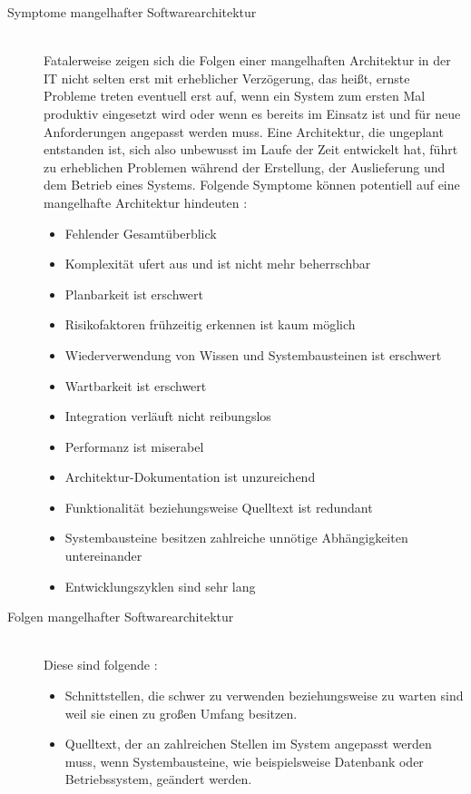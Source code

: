 \begin{description}
\item[Symptome mangelhafter Softwarearchitektur] \hfill \\
Fatalerweise zeigen sich die Folgen einer mangelhaften Architektur in der IT nicht selten erst mit erheblicher Verzögerung, das heißt, ernste Probleme treten eventuell erst auf, wenn ein System zum ersten Mal produktiv eingesetzt wird oder wenn es bereits im Einsatz ist und für neue Anforderungen angepasst werden muss. Eine Architektur, die ungeplant entstanden ist, sich also unbewusst im Laufe der Zeit entwickelt hat, führt zu erheblichen Problemen während der Erstellung, der Auslieferung und dem Betrieb eines Systems. Folgende Symptome können potentiell auf eine mangelhafte Architektur hindeuten \citereset \autocite{Vogel.2009}:
\begin{itemize}
\item Fehlender Gesamtüberblick
\item Komplexität ufert aus und ist nicht mehr beherrschbar
\item Planbarkeit ist erschwert
\item Risikofaktoren frühzeitig erkennen ist kaum möglich
\item Wiederverwendung von Wissen und Systembausteinen ist erschwert
\item Wartbarkeit ist erschwert
\item Integration verläuft nicht reibungslos
\item Performanz ist miserabel
\item Architektur-Dokumentation ist unzureichend
\item Funktionalität beziehungsweise Quelltext ist redundant
\item Systembausteine besitzen zahlreiche unnötige Abhängigkeiten untereinander
\item Entwicklungszyklen sind sehr lang
\end{itemize}
\item[Folgen mangelhafter Softwarearchitektur] \hfill \\
Diese sind folgende \citereset \autocite{Vogel.2009}:
\begin{itemize}
\item Schnittstellen, die schwer zu verwenden beziehungsweise zu warten sind weil sie einen zu großen Umfang besitzen.
\item Quelltext, der an zahlreichen Stellen im System angepasst werden muss, wenn Systembausteine, wie beispielsweise Datenbank oder Betriebssystem, geändert werden.

\end{itemize}
\end{description}
